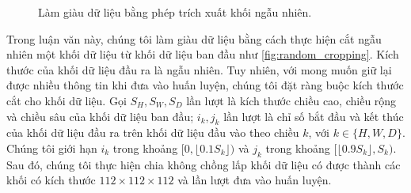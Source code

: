 	\begin{figure}[h!]
		\centering
		
		\caption{Làm giàu dữ liệu bằng phép trích xuất khối ngẫu nhiên.}
		\label{fig:random_cropping}
	\end{figure}
	Trong luận văn này, chúng tôi làm giàu dữ liệu bằng cách thực hiện cắt ngẫu nhiên một khối dữ liệu từ khối dữ liệu ban đầu như \autoref{fig:random_cropping}. Kích thước của khối dữ liệu đầu ra là ngẫu nhiên. Tuy nhiên, với mong muốn giữ lại được nhiều thông tin khi đưa vào huấn luyện, chúng tôi đặt ràng buộc kích thước cắt cho khối dữ liệu. Gọi $S_H, S_W, S_D$ lần lượt là kích thước chiều cao, chiều rộng và chiều sâu của khối dữ liệu ban đầu; $i_k, j_k$ lần lượt là chỉ số bắt đầu và kết thúc của khối dữ liệu đầu ra trên khối dữ liệu đầu vào theo chiều $k$, với $k\in\{H,W,D\}$. Chúng tôi giới hạn $i_k$ trong khoảng $[0, \lfloor0.1S_k\rfloor)$ và $j_k$ trong khoảng $[\lfloor0.9S_k\rfloor, S_k)$. Sau đó, chúng tôi thực hiện chia không chồng lấp khối dữ liệu có được thành các khối có kích thước $112\times112\times112$ và lần lượt đưa vào huấn luyện.

